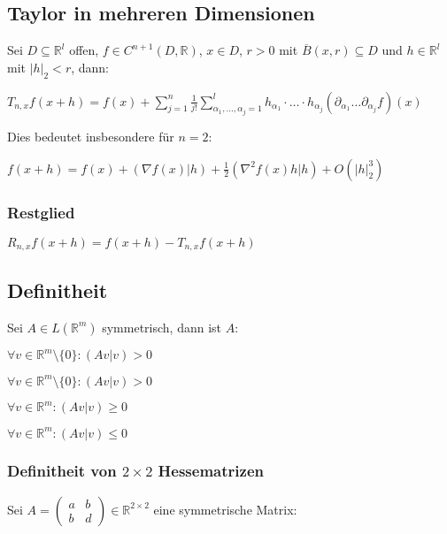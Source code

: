 \subsection*{Taylor in mehreren Dimensionen}

Sei $D \subseteq \mathbb{R}^l$ offen, $f \in C^{n+1}(D, \mathbb{R})$, $x \in D$, $r > 0$ mit $\overline B(x,r) \subseteq D$ und $h \in \mathbb{R}^l$ mit $|h|_2 < r$, dann:

$T_{n,x} f(x+h) = f(x) + \displaystyle\sum_{j=1}^n \frac{1}{j!} \displaystyle\sum_{\alpha_1, ..., \alpha_j=1}^l h_{\alpha_1} \cdot \hdots \cdot h_{\alpha_j} ( \partial_{\alpha_1} \hdots \partial_{\alpha_j} f )(x)$

Dies bedeutet insbesondere für $n=2$:

$f(x+h) = f(x) + (\nabla f(x)|h) + \frac{1}{2}(\nabla^2 f(x)h|h) + O(|h|_2^3)$

\subsubsection*{Restglied}

$R_{n,x} f(x+h) = f(x+h) - T_{n,x}f(x+h)$

\subsection*{Definitheit}

Sei $A \in L(\mathbb{R}^m)$ symmetrisch, dann ist $A$:

\begin{description}[leftmargin=!,labelwidth=28mm]
	\item[positiv definit]     $\forall v \in \mathbb{R}^m \setminus \{0\} : (Av|v) > 0$
	\item[negativ definit]     $\forall v \in \mathbb{R}^m \setminus \{0\} : (Av|v) > 0$
	\item[positiv semidefinit] $\forall v \in \mathbb{R}^m : (Av|v) \geq 0$
	\item[negativ semidefinit] $\forall v \in \mathbb{R}^m : (Av|v) \leq 0$
\end{description}

\subsubsection*{Definitheit von $2\times 2$ Hessematrizen}

Sei $A = \begin{pmatrix} a & b \\ b & d \end{pmatrix} \in \mathbb{R}^{2 \times 2}$ eine symmetrische Matrix:

